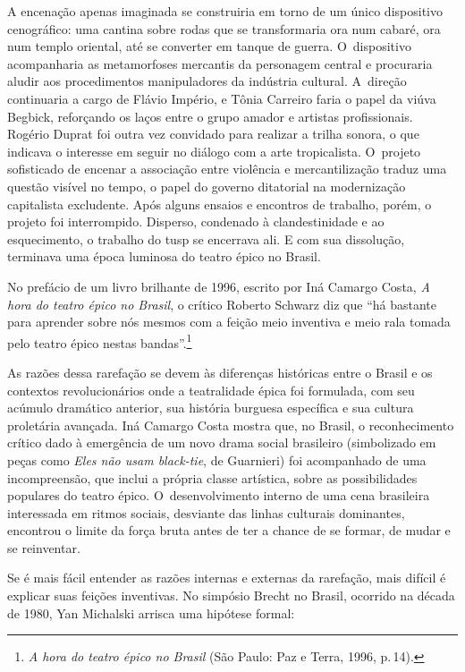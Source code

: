 {A encenação apenas imaginada se construiria em torno de um único
dispositivo cenográfico: uma cantina sobre rodas que se transformaria
ora num cabaré, ora num templo oriental, até se converter em tanque de
guerra. O~dispositivo acompanharia as metamorfoses mercantis da
personagem central e procuraria aludir aos procedimentos manipuladores
da indústria cultural. A~direção continuaria a cargo de Flávio Império,
e Tônia Carreiro faria o papel da viúva Begbick, reforçando os laços
entre o grupo amador e artistas profissionais. Rogério Duprat foi outra
vez convidado para realizar a trilha sonora, o que indicava o interesse
em seguir no diálogo com a arte tropicalista. O~projeto
sofisticado de encenar a associação entre violência e mercantilização
traduz uma questão visível no tempo, o papel do governo ditatorial na
modernização capitalista excludente. Após alguns ensaios e encontros de
trabalho, porém, o projeto foi interrompido. Disperso, condenado à
clandestinidade e ao esquecimento, o trabalho do {\sc tusp} se encerrava ali.
E com sua dissolução, terminava uma época luminosa do teatro épico no
Brasil.

No prefácio de um livro brilhante de 1996, escrito por Iná Camargo
Costa, {\it A hora do teatro épico no Brasil}, o crítico Roberto Schwarz
diz que “há bastante para aprender sobre nós mesmos com a feição meio
inventiva e meio rala tomada pelo teatro épico nestas
bandas”.\footnote{{\it A hora do teatro épico no Brasil} (São Paulo: Paz
  e Terra, 1996, p.\,14).}

As razões dessa rarefação se devem às diferenças históricas entre o
Brasil e os contextos revolucionários onde a teatralidade épica foi
formulada, com seu acúmulo dramático anterior, sua história burguesa
específica e sua cultura proletária avançada. Iná Camargo Costa mostra
que, no Brasil, o reconhecimento crítico dado à emergência de um novo
drama social brasileiro (simbolizado em peças como {\it Eles não usam
black-tie}, de Guarnieri) foi acompanhado de uma incompreensão, que
inclui a própria classe artística, sobre as possibilidades populares do
teatro épico. O~desenvolvimento interno de uma cena brasileira
interessada em ritmos sociais, desviante das linhas culturais
dominantes, encontrou o limite da força bruta antes de ter a chance de
se formar, de mudar e se reinventar.

Se é mais fácil entender as razões internas e externas da rarefação,
mais difícil é explicar suas feições inventivas. No simpósio Brecht no Brasil, ocorrido na década de 1980, Yan Michalski arrisca uma hipótese
formal:

}
